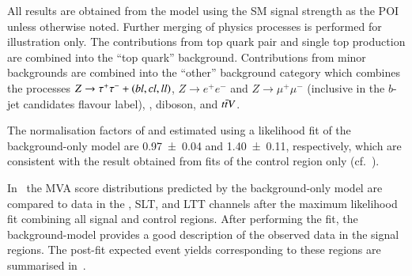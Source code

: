 All results are obtained from the model using the SM \HH signal
strength as the POI unless otherwise noted. Further merging of physics
processes is performed for illustration only. The contributions from
top quark pair and single top production are combined into the ``top
quark'' background. Contributions from minor backgrounds are combined
into the ``other'' background category which combines the processes
$Z \to \tau^{+} \tau^{-} + (bl,cl,ll)$, $Z \to e^{+}e^{-}$ and
$Z \to \mu^{+}\mu^{-}$ (inclusive in the $b$-jet candidates flavour
label), \Wjets, diboson, and $t\bar{t} V$.

The normalisation factors of \ttbar and \ZHF estimated using a
likelihood fit of the background-only model are \num{0.97 +- 0.04} and
\num{1.40 +- 0.11}, respectively, which are consistent with the result
obtained from fits of the control region only (cf.\
).

In~ the MVA score distributions predicted
by the background-only model are compared to data in the \hadhad,
\lephad SLT, and \lephad LTT channels after the maximum likelihood fit
combining all signal and control regions. After performing the fit,
the background-model provides a good description of the observed data
in the signal regions. The post-fit expected event yields
corresponding to these regions are summarised
in~.

